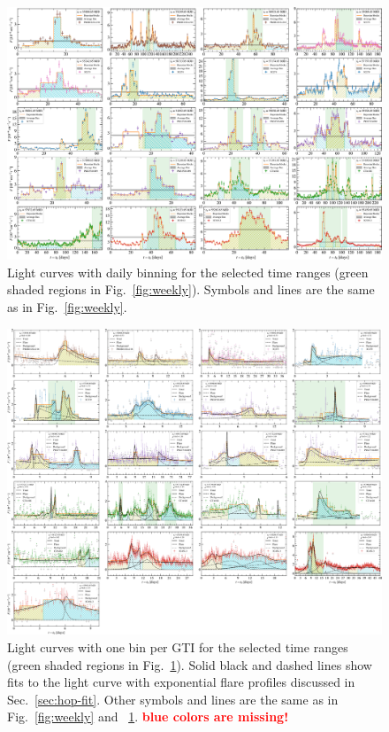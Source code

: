 \documentclass[twocolumn,linenumbers]{aastex62}
\newcommand{\todo}[1]{\textbf{\textcolor{red}{#1}}}
\begin{document}
\begin{figure}
    \centering
    \includegraphics[width = .99\linewidth]{figures/lc_daily_tsmin9.pdf}
    \caption{\label{fig:daily} Light curves with daily binning for the selected time ranges (green shaded regions in Fig.~\ref{fig:weekly}). Symbols and lines are the same as in Fig.~\ref{fig:weekly}.}
\end{figure}


\begin{figure}
    \centering
    \includegraphics[width = .99\linewidth]{figures/lcfithop_orbit_all_maxiter2_fsys0p00_addcomp0_comb.pdf}
    \caption{ Light curves with one bin per GTI for the selected time ranges (green shaded regions in Fig.~\ref{fig:daily}). Solid black and dashed lines show fits to the light curve with exponential flare profiles discussed in Sec.~\ref{sec:hop-fit}. Other symbols and lines are the same as in Fig.~\ref{fig:weekly} and ~\ref{fig:daily}.
    \todo{blue colors are missing!}
    }
    \label{fig:gti}
\end{figure}
\end{document}
